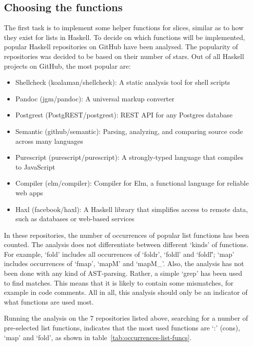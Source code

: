 \subsection{Choosing the functions}

The first task is to implement some helper functions for slices, similar as to how they exist
for lists in Haskell. To decide on which functions will be implemented, popular
Haskell repositories on GitHub have been analysed. The popularity of repositories
was decided to be based on their number of stars. Out of all Haskell projects
on GitHub, the most popular are\autocite{github-popular-haskell}:

\begin{itemize}
    \item Shellcheck (koalaman/shellcheck\autocite{github-shellcheck}): A static analysis tool for shell scripts
    \item Pandoc (jgm/pandoc\autocite{github-pandoc}): A universal markup converter
    \item Postgrest (PostgREST/postgrest\autocite{github-postgrest}): REST API for any Postgres database
    \item Semantic (github/semantic\autocite{github-semantic}): Parsing, analyzing, and comparing source code across many languages
    \item Purescript (purescript/purescript\autocite{github-purescript}): A strongly-typed language that compiles to JavaScript
    \item Compiler (elm/compiler\autocite{github-elmcompiler}): Compiler for Elm, a functional language for reliable web apps
    \item Haxl (facebook/haxl\autocite{github-haxl}): A Haskell library that simplifies access to remote data, such as databases or web-based services
\end{itemize}

In these repositories, the number of occurrences of popular list functions has
been counted. The analysis does not differentiate between different `kinds' of
functions. For example, `fold' includes all occurrences of `foldr', `foldl' and
`foldl\''; `map' includes occurrences of `fmap', `mapM' and `mapM\_'.
Also, the analysis has not been done with any kind of AST-parsing.
Rather, a simple `grep' has been used to find matches. This means that it is
likely to contain some mismatches, for example in code comments. All in all,
this analysis should only be an indicator of what functions are used most.

Running the analysis on the 7 repositories listed above, searching for a number
of pre-selected list functions, indicates that the most used functions are `:'
(cons), `map' and `fold', as shown in table~\ref{tab:occurrences-list-funcs}.

